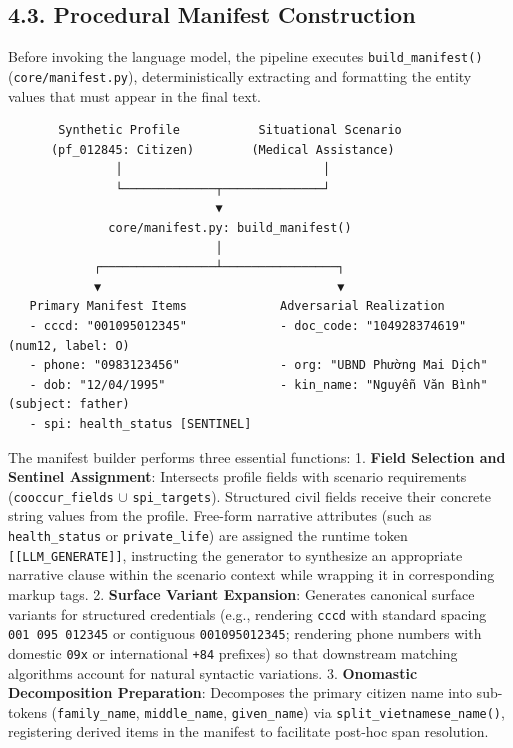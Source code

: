 \documentclass[
]{article}
\begin{document}
\subsection{4.3. Procedural Manifest
Construction}\label{procedural-manifest-construction}

Before invoking the language model, the pipeline executes
\texttt{build\_manifest()} (\texttt{core/manifest.py}),
deterministically extracting and formatting the entity values that must
appear in the final text.

\begin{verbatim}
       Synthetic Profile           Situational Scenario
      (pf_012845: Citizen)        (Medical Assistance)
               │                            │
               └─────────────┬──────────────┘
                             ▼
              core/manifest.py: build_manifest()
                             │
            ┌────────────────┴────────────────┐
            ▼                                 ▼
   Primary Manifest Items             Adversarial Realization
   - cccd: "001095012345"             - doc_code: "104928374619" (num12, label: O)
   - phone: "0983123456"              - org: "UBND Phường Mai Dịch"
   - dob: "12/04/1995"                - kin_name: "Nguyễn Văn Bình" (subject: father)
   - spi: health_status [SENTINEL]
\end{verbatim}

The manifest builder performs three essential functions: 1.
\textbf{Field Selection and Sentinel Assignment}: Intersects profile
fields with scenario requirements (\texttt{cooccur\_fields} \(\cup\)
\texttt{spi\_targets}). Structured civil fields receive their concrete
string values from the profile. Free-form narrative attributes (such as
\texttt{health\_status} or \texttt{private\_life}) are assigned the
runtime token \texttt{{[}{[}LLM\_GENERATE{]}{]}}, instructing the
generator to synthesize an appropriate narrative clause within the
scenario context while wrapping it in corresponding markup tags. 2.
\textbf{Surface Variant Expansion}: Generates canonical surface variants
for structured credentials (e.g., rendering \texttt{cccd} with standard
spacing \texttt{001\ 095\ 012345} or contiguous \texttt{001095012345};
rendering phone numbers with domestic \texttt{09x} or international
\texttt{+84} prefixes) so that downstream matching algorithms account
for natural syntactic variations. 3. \textbf{Onomastic Decomposition
Preparation}: Decomposes the primary citizen name into sub-tokens
(\texttt{family\_name}, \texttt{middle\_name}, \texttt{given\_name}) via
\texttt{split\_vietnamese\_name()}, registering derived items in the
manifest to facilitate post-hoc span resolution.
\end{document}
